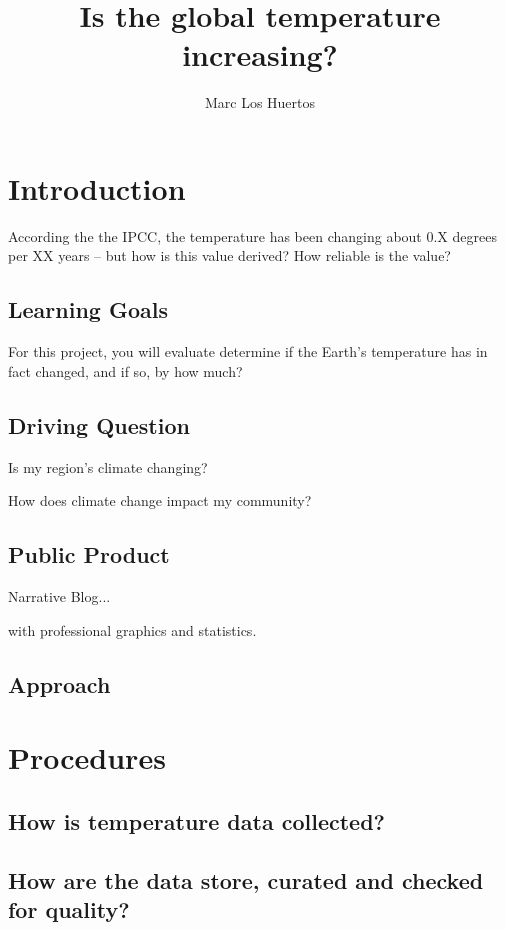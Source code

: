 \documentclass{article}\usepackage[]{graphicx}\usepackage[]{color}
\title{Is the global temperature increasing?}
\author{Marc Los Huertos}
\date{}
\begin{document}
\maketitle

\section{Introduction}

According the the IPCC, the temperature has been changing about 0.X degrees per XX years -- but how is this value derived? How reliable is the value?  

\subsection{Learning Goals}

For this project, you will evaluate determine if the Earth's temperature has in fact changed, and if so, by how much?

\subsection{Driving Question}

Is my region's climate changing?

How does climate change impact my community?

\subsection{Public Product}

Narrative Blog...

with professional graphics and statistics.

\subsection{Approach}


\section{Procedures}

\subsection{How is temperature data collected?}

\subsection{How are the data store, curated and checked for quality?}
\end{document}
